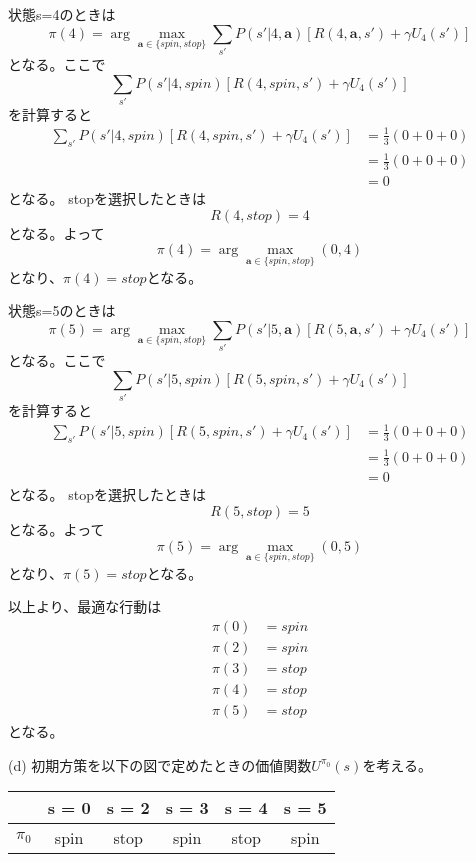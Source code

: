 \documentclass[a4paper,11pt,dvipdfmx]{jsarticle}
\begin{document}
状態s=4のときは
\[\pi(4)=\arg\max_{\textbf{a}\in\{spin,stop\}}\sum_{s'}P(s'|4,\textbf{a})[R(4,\textbf{a},s')+\gamma U_4(s')]\]
となる。ここで
\[\sum_{s'}P(s'|4,spin)[R(4,spin,s')+\gamma U_4(s')]\]
を計算すると
\begin{align*}
    \sum_{s'}P(s'|4,spin)[R(4,spin,s')+\gamma U_4(s')] &= \frac{1}{3}(0+0+0) \\
                                                     &= \frac{1}{3}(0+0+0) \\
                                                     &= 0
\end{align*}
となる。
stopを選択したときは
\[R(4,stop)=4\]
となる。よって
\[\pi(4)=\arg\max_{\textbf{a}\in\{spin,stop\}}(0, 4)\]
となり、\(\pi(4)=stop\)となる。

状態s=5のときは
\[\pi(5)=\arg\max_{\textbf{a}\in\{spin,stop\}}\sum_{s'}P(s'|5,\textbf{a})[R(5,\textbf{a},s')+\gamma U_4(s')]\]
となる。ここで
\[\sum_{s'}P(s'|5,spin)[R(5,spin,s')+\gamma U_4(s')]\]
を計算すると
\begin{align*}
    \sum_{s'}P(s'|5,spin)[R(5,spin,s')+\gamma U_4(s')] &= \frac{1}{3}(0+0+0) \\
                                                     &= \frac{1}{3}(0+0+0) \\
                                                     &= 0
\end{align*}
となる。
stopを選択したときは
\[R(5,stop)=5\]
となる。よって
\[\pi(5)=\arg\max_{\textbf{a}\in\{spin,stop\}}(0, 5)\]
となり、\(\pi(5)=stop\)となる。

以上より、最適な行動は
\begin{align*}
    \pi(0) &= spin \\
    \pi(2) &= spin \\
    \pi(3) &= stop \\
    \pi(4) &= stop \\
    \pi(5) &= stop
\end{align*}
となる。

(d)
初期方策を以下の図で定めたときの価値関数\(U^{\pi_0}(s)\)を考える。
\begin{center}
    \begin{tabular}[h]{c|c|c|c|c|c}
        & s = 0 & s = 2 & s = 3 & s = 4 & s = 5 \\
        \hline
        $\pi_0$ & spin & stop & spin  & stop & spin
    \end{tabular}
\end{center}
\end{document}
